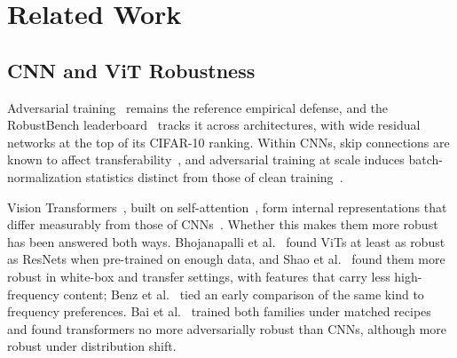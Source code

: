 \section{Related Work}
\label{sec:related_work}

\subsection{CNN and ViT Robustness}
\label{subsec:rw_robustness}

Adversarial training~\cite{madry2018towards} remains the reference empirical defense, and the RobustBench leaderboard~\cite{croce2021robustbench} tracks it across architectures, with wide residual networks at the top of its CIFAR-10 ranking. Within CNNs, skip connections are known to affect transferability~\cite{wu2020skip}, and adversarial training at scale induces batch-normalization statistics distinct from those of clean training~\cite{xie2020intriguing}.

Vision Transformers~\cite{dosovitskiy2021image}, built on self-attention~\cite{vaswani2017attention}, form internal representations that differ measurably from those of CNNs~\cite{raghu2021vision}. Whether this makes them more robust has been answered both ways. Bhojanapalli et al.~\cite{bhojanapalli2021understanding} found ViTs at least as robust as ResNets when pre-trained on enough data, and Shao et al.~\cite{shao2022adversarial} found them more robust in white-box and transfer settings, with features that carry less high-frequency content; Benz et al.~\cite{benz2021adversarial} tied an early comparison of the same kind to frequency preferences. Bai et al.~\cite{bai2021transformers} trained both families under matched recipes and found transformers no more adversarially robust than CNNs, although more robust under distribution shift.

